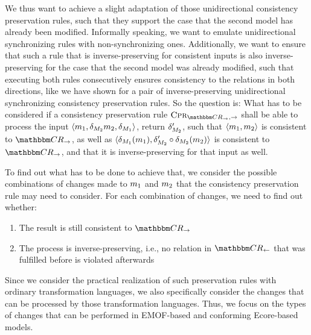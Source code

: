We thus want to achieve a slight adaptation of those unidirectional consistency preservation rules, such that they support the case that the second model has already been modified.
Informally speaking, we want to emulate unidirectional synchronizing rules with non-synchronizing ones.
Additionally, we want to ensure that such a rule that is inverse-preserving for consistent inputs is also inverse-preserving for the case that the second model was already modified, such that executing both rules consecutively ensures consistency to the relations in both directions, like we have shown for a pair of inverse-preserving unidirectional synchronizing consistency preservation rules.
So the question is:
What has to be considered if a consistency preservation rule $\consistencypreservationrule{\consistencyrelationset{CR}_{\rightarrow},\rightarrow}$ shall be able to process the input $\langle m_{1},\delta_{M_{2}}m_{2},\delta_{M_{1}} \rangle$, return $\delta_{M_{2}}'$, such that $\langle m_{1},m_{2} \rangle$ is consistent to $\consistencyrelationset{CR}_{\rightarrow}$, as well as $\langle \delta_{M_{1}}(m_{1}),\delta_{M_{2}}' \circ \delta_{M_{2}}(m_{2}) \rangle$ is consistent to $\consistencyrelationset{CR}_{\rightarrow}$, and that it is inverse-preserving for that input as well.

To find out what has to be done to achieve that, we consider the possible combinations of changes made to $m_{1}$ and $m_{2}$ that the consistency preservation rule may need to consider.
For each combination of changes, we need to find out whether:
\begin{enumerate}
    \item The result is still consistent to $\consistencyrelationset{CR}_{\rightarrow}$
    \item The process is inverse-preserving, i.e., no relation in $\consistencyrelationset{CR}_{\leftarrow}$ that was fulfilled before is violated afterwards
\end{enumerate}

Since we consider the practical realization of such preservation rules with ordinary transformation languages, we also specifically consider the changes that can be processed by those transformation languages.
Thus, we focus on the types of changes that can be performed in EMOF-based and conforming Ecore-based models.




